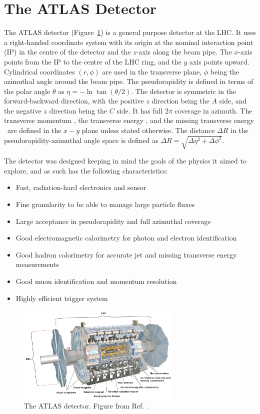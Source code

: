 \section{The ATLAS Detector}
The ATLAS detector (Figure~\ref{fig:atlas}) is a general purpose detector at the LHC.
It uses a right-handed coordinate system with its origin at the nominal interaction point (IP) in the
 centre of the detector and the $z$-axis along the beam pipe.
The $x$-axis points from the IP to the centre of the LHC ring, and the $y$ axis points upward.
Cylindrical coordinates 
 $(r,\phi)$ are used in the transverse plane, $\phi$ being the azimuthal angle around the beam pipe.
The pseudorapidity is defined in terms of the polar angle $\theta$ as 
 $\eta=-\ln\tan(\theta/2)$.
The detector is symmetric in the forward-backward direction, with the positive $z$ direction being the $A$ side, and the negative $z$ direction being the $C$ side.
It has full $2\pi$ coverage in azimuth.
 The transverse momentum \pt, the transverse energy \Et, and the missing transverse energy \Etmiss\ are defined in the $x-y$ plane unless stated otherwise.
The distance $\Delta R$ in the pseudorapidity-azimuthal angle space is defined as $\Delta R = \sqrt{\Delta \eta^2 + \Delta \phi^2}$.

The detector was designed keeping in mind the goals of the physics it aimed to explore, and as such has the following characteristics:
\begin{itemize}
\item Fast, radiation-hard electronics and sensor
\item Fine granularity to be able to manage large particle fluxes
\item Large acceptance in pseudorapidity and full azimuthal coverage
\item Good electromagnetic calorimetry for photon and electron identification
\item Good hadron calorimetry for accurate jet and missing transverse energy measurements
\item Good muon identification and momentum resolution
\item Highly efficient trigger system 
\end{itemize}

\begin{figure}[ht]
	\centering
	\includegraphics[width=0.7\textwidth]{figures/setup/atlas.pdf}
	\caption{The ATLAS detector.
Figure from Ref.~\cite{Aad:2008zzm}.}	
	\label{fig:atlas}
\end{figure}


